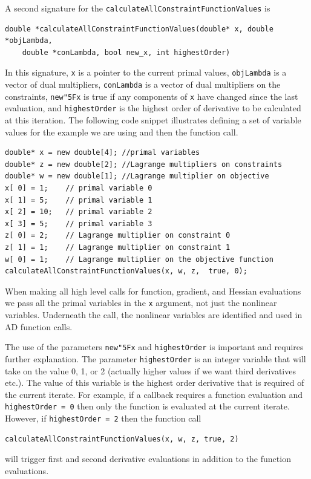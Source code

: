 \documentclass[11pt]{article}
\renewcommand{\_}{{\char"5F}}
\renewcommand{\{}{{\char"7B}}
\renewcommand{\}}{{\char"7D}}
\renewcommand{\^}{{\char"0D}}
\renewcommand{\'}{{\char"0D}}
\begin{document}
\begin{enumerate}[Step 1:]
A second signature for the {\tt calculateAllConstraintFunctionValues} is
\begin{verbatim}
double *calculateAllConstraintFunctionValues(double* x, double *objLambda,
    double *conLambda, bool new_x, int highestOrder)
\end{verbatim}
In this  signature, {\tt x} is a pointer to the current primal values, {\tt objLambda} is a vector of dual multipliers, {\tt conLambda} is a vector of dual multipliers on the constraints,  {\tt new\_x} is true if any components of {\tt x} have changed since the last evaluation, and {\tt highestOrder} is the highest order of derivative to be calculated at this iteration. The following code snippet illustrates defining a set of variable values for the example we are using and then the function call.
\begin{verbatim}
double* x = new double[4]; //primal variables
double* z = new double[2]; //Lagrange multipliers on constraints
double* w = new double[1]; //Lagrange multiplier on objective
x[ 0] = 1;    // primal variable 0
x[ 1] = 5;    // primal variable 1
x[ 2] = 10;   // primal variable 2
x[ 3] = 5;    // primal variable 3
z[ 0] = 2;    // Lagrange multiplier on constraint 0
z[ 1] = 1;    // Lagrange multiplier on constraint 1
w[ 0] = 1;    // Lagrange multiplier on the objective function
calculateAllConstraintFunctionValues(x, w, z,  true, 0);
\end{verbatim}
When making all high level calls for function, gradient, and Hessian evaluations we pass all the primal variables in the {\tt x} argument, not just the nonlinear variables. Underneath the call, the nonlinear variables are identified and used in AD function calls.

The use of the parameters  {\tt new\_x} and {\tt highestOrder}  is important and requires further explanation.    The parameter  {\tt highestOrder}  is an integer variable that will take on the value 0, 1, or 2 (actually higher values if we want third derivatives etc.).  The value of this variable is the highest order derivative that is required of the current iterate. For example, if  a callback requires a function evaluation and {\tt highestOrder = 0} then only the function is evaluated at the current iterate.  However,  if {\tt highestOrder = 2} then the function call
\begin{verbatim}
calculateAllConstraintFunctionValues(x, w, z, true, 2)
\end{verbatim}
will trigger  first and second derivative evaluations in addition to the function evaluations.


\end{enumerate}
\end{document}
